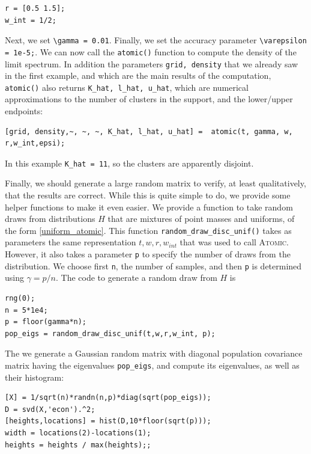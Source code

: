 \documentclass[english,11pt]{article} %
\begin{document}
\begin{verbatim}
r = [0.5 1.5];
w_int = 1/2;
\end{verbatim}

Next, we set \verb+\gamma = 0.01+. Finally, we set the accuracy parameter \verb+\varepsilon = 1e-5;+. We can now call the \verb+atomic()+ function to compute the density of the limit spectrum. In addition the parameters  \verb+grid, density+ that we already saw in the first example, and which are the main results of the computation,  \verb+atomic()+ also returns \verb+K_hat, l_hat, u_hat+, which are numerical approximations to the number of clusters in the support, and the lower/upper endpoints:


\begin{verbatim}
[grid, density,~, ~, ~, K_hat, l_hat, u_hat] =  atomic(t, gamma, w, r,w_int,epsi);
\end{verbatim}

In this example \verb+K_hat = 11+, so the clusters are apparently disjoint. 

Finally, we should generate a large random matrix to verify, at least qualitatively, that the results are correct. While this is quite simple to do, we provide some helper functions to make it even easier. We provide a function to take random draws from distributions $H$ that are mixtures of point masses and uniforms, of the form \ref{uniform_atomic}. This function \verb+random_draw_disc_unif()+ takes as parameters the same representation $t,w,r,w_{int}$ that was used to call \textsc{Atomic}. However, it also takes a parameter \verb+p+ to specify the number of draws from the distribution. We choose first \verb+n+, the number of samples, and then \verb+p+ is determined using $\gamma = p/n$. The code to generate a random draw from $H$ is

\begin{verbatim}
rng(0);
n = 5*1e4;
p = floor(gamma*n);
pop_eigs = random_draw_disc_unif(t,w,r,w_int, p);
\end{verbatim}

The we generate a Gaussian random matrix with diagonal population covariance matrix having the eigenvalues \verb+pop_eigs+, and compute its eigenvalues, as well as their histogram:  

\begin{verbatim}
[X] = 1/sqrt(n)*randn(n,p)*diag(sqrt(pop_eigs));
D = svd(X,'econ').^2;
[heights,locations] = hist(D,10*floor(sqrt(p)));
width = locations(2)-locations(1);
heights = heights / max(heights);;
\end{verbatim}
\end{document}

